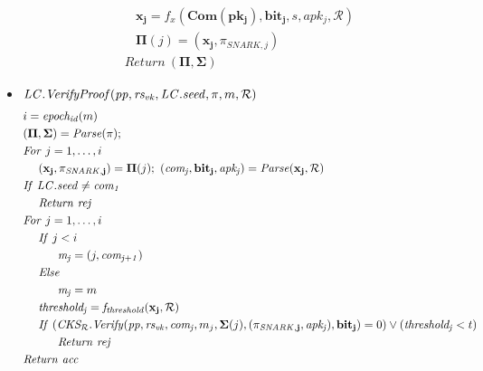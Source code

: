 \begin{itemize}
\begin{align*}
&\ \ \ \ \ \ \ \ \mathbf{x_j} = f_x(\mathbf{Com}(\mathbf{pk_j}), \mathbf{bit_j}, s,  \mathit{apk_{j}}, \mathcal{R}) \\
&\ \ \ \ \ \ \ \ \mathbf{\Pi}(j) = (\mathbf{x_j}, \mathit{\pi_{\mathit{SNARK}, j}}) \\
&\ \ \ \ \mathit{Return} \ (\mathbf{\Pi}, \mathbf{\Sigma})  
\end{align*}
\end{itemize}
\vspace{-0.5cm}
\begin{itemize}
\item $\mathit{LC.VerifyProof}(\mathit{pp}, \mathit{rs_{\mathit{vk}}}, \mathit{LC.seed}, \pi, m, \mathcal{R})$
\vspace{-0.9cm}
\begin{align*}
& i = \mathit{epoch_{id}}(m) \\
& (\mathbf{\Pi}, \mathbf{\Sigma}) = \mathit{Parse}(\pi);  \\
& \mathit{For} \ j = 1, \ldots, i \\
& \ \ \ \ (\mathbf{x_j}, \mathbf{\pi_{\mathit{SNARK},j}}) = \mathbf{\Pi}(j); \ (\mathit{com_j}, \mathbf{bit_j}, \mathit{apk_j}) = \mathit{Parse}(\mathbf{x_j}, \mathcal{R}) \\
& \mathit{If} \ \mathit{LC.seed} \neq \mathit{com_1} \\
& \ \ \ \ \mathit{Return} \ \mathit{rej} \\
& \mathit{For} \ j = 1, \ldots, i \\
& \ \ \ \ \mathit{If} \ j < i\\
& \ \ \ \ \ \ \ \ \ \mathit{m_j} = (j, \mathit{com_{j+1}}) \\
& \ \ \ \ \mathit{Else}\\
& \ \ \ \ \ \ \ \ \ \mathit{m_j} = m \\
& \ \ \ \ \mathit{threshold_j} = \mathit{f_{\mathit{threshold}}}(\mathbf{x_j}, \mathcal{R})  \\
& \ \ \ \ \mathit{If} \ (\mathit{CKS_{\mathcal{R}}.Verify}(\mathit{pp},  \mathit{rs_{\mathit{vk}}}, \mathit{com_j}, m_j,  \mathbf{\Sigma}(j), (\mathbf{\pi_{\mathit{SNARK},j}},\mathit{apk_j}), 
\mathbf{bit_j}) = 0)  \vee (\mathit{threshold_j} < t) \\
& \ \ \ \ \ \ \ \ \ \mathit{Return} \ \mathit{rej} \\
& \mathit{Return} \ \mathit{acc} \\
\end{align*}
\end{itemize}
